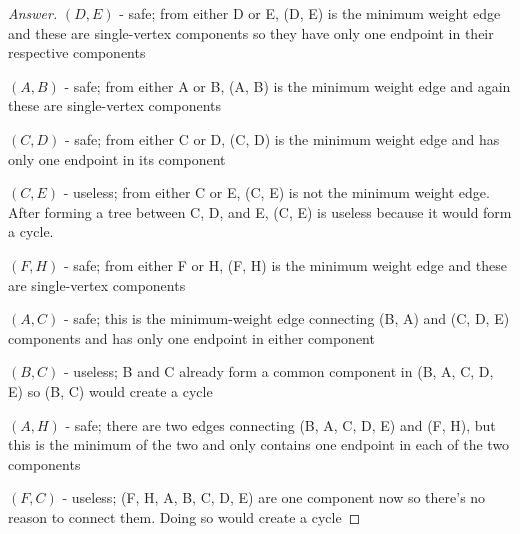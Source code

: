 \documentclass[11pt]{article}
\theoremstyle{definition}
\theoremstyle{definition}
\theoremstyle{definition}
\begin{document}
\begin{proof}[Answer]

$(D, E)$ - safe; from either D or E, (D, E) is the minimum weight edge and these are single-vertex components so they have only one endpoint in their respective components

$(A, B)$ - safe; from either A or B, (A, B) is the minimum weight edge and again these are single-vertex components 

$(C, D)$ - safe; from either C or D, (C, D) is the minimum weight edge and has only one endpoint in its component

$(C, E)$ - useless; from either C or E, (C, E) is not the minimum weight edge. After forming a tree between C, D, and E, (C, E) is useless because it would form a cycle. 

$(F, H)$ - safe; from either F or H, (F, H) is the minimum weight edge and these are single-vertex components

$(A, C)$ - safe; this is the minimum-weight edge connecting (B, A) and (C, D, E) components and has only one endpoint in either component 

$(B, C)$ - useless; B and C already form a common component in (B, A, C, D, E) so (B, C) would create a cycle

$(A, H)$ - safe; there are two edges connecting (B, A, C, D, E) and (F, H), but this is the minimum of the two and only contains one endpoint in each of the two components

$(F, C)$ - useless; (F, H, A, B, C, D, E) are one component now so there's no reason to connect them. Doing so would create a cycle

\end{proof}

\newpage
\end{document}

